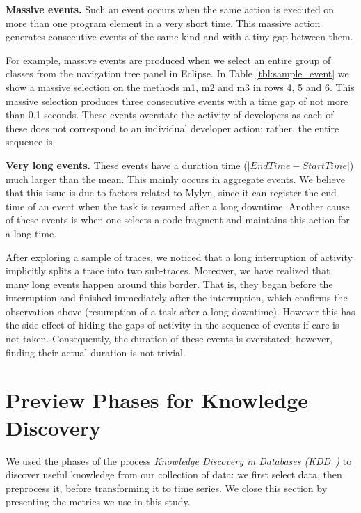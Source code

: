 \documentclass[times]{smrauth}
\begin{document}
\textbf{Massive events. } Such an event occurs when the same action is executed on more than one program element in a very short time. This massive action generates consecutive events of the same kind and with a tiny gap between them.

For example, massive events are produced when we select an entire group of classes from the navigation tree panel in Eclipse. In  Table \ref{tbl:sample_event} we show a massive selection on the methods m1, m2 and m3  in rows 4, 5 and 6. This massive selection produces three consecutive events with a time gap of not more than 0.1 seconds. These events overstate the activity of developers as each of these does not correspond to an individual developer action; rather, the entire sequence is.


\textbf{Very long events. } These events have a duration time ($|EndTime - StartTime|$) much larger than the mean. This mainly occurs in aggregate events. We believe that this issue is due to factors related to Mylyn, since it can register the end time of an event when the task is resumed after a long downtime. Another cause of these events is when one selects a code fragment and maintains this action for a long time. 
 
After exploring a sample of traces, we noticed that a long interruption of activity implicitly splits a trace into two sub-traces.  Moreover,  we have realized that many long events happen around this border. That is, they began before the interruption and finished immediately after the interruption, which confirms the observation above (resumption of a task after a long downtime). However this has the side effect of hiding the gaps of activity in the sequence of events if care is not taken. Consequently, the duration of these events is overstated; however, finding their actual duration is not trivial. 




\section{Preview Phases for Knowledge Discovery}
We used the phases of the process \textit{Knowledge Discovery in Databases (KDD~\cite{FPP96})} to discover useful knowledge from our collection of data: we first select data, then preprocess it, before transforming it to time series. We close this section by presenting the metrics we use in this study. %
\end{document}
